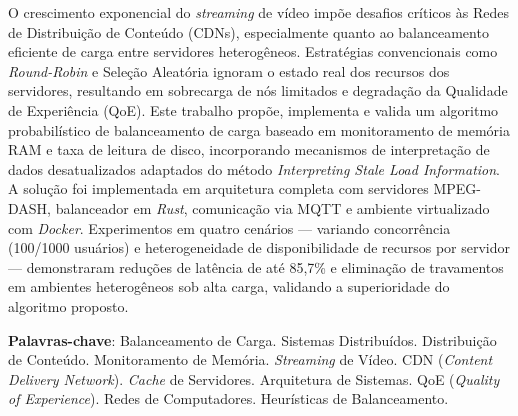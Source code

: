 
\setlength{\absparsep}{18pt} %
\begin{resumo}
O crescimento exponencial do \textit{streaming} de vídeo impõe desafios críticos às Redes de Distribuição de Conteúdo (CDNs), especialmente quanto ao balanceamento eficiente de carga entre servidores heterogêneos.
%
Estratégias convencionais como \textit{Round-Robin} e Seleção Aleatória ignoram o estado real dos recursos dos servidores, resultando em sobrecarga de nós limitados e degradação da Qualidade de Experiência (QoE).
%
Este trabalho propõe, implementa e valida um algoritmo probabilístico de balanceamento de carga baseado em monitoramento de memória RAM e taxa de leitura de disco, incorporando mecanismos de interpretação de dados desatualizados adaptados do método \textit{Interpreting Stale Load Information}.
%
A solução foi implementada em arquitetura completa com servidores MPEG-DASH, balanceador em \textit{Rust}, comunicação via MQTT e ambiente virtualizado com \textit{Docker}.
%
Experimentos em quatro cenários — variando concorrência (100/1000 usuários) e heterogeneidade de disponibilidade de recursos por servidor — demonstraram reduções de latência de até 85,7\% e eliminação de travamentos em ambientes heterogêneos sob alta carga, validando a superioridade do algoritmo proposto.

 \textbf{Palavras-chave}: 
 Balanceamento de Carga.
 Sistemas Distribuídos.
 Distribuição de Conteúdo.
 Monitoramento de Memória.
 \textit{Streaming} de Vídeo.
 CDN (\textit{Content Delivery Network}).
 \textit{Cache} de Servidores.
 Arquitetura de Sistemas.
 QoE (\textit{Quality of Experience}).
 Redes de Computadores.
 Heurísticas de Balanceamento.
\end{resumo}
